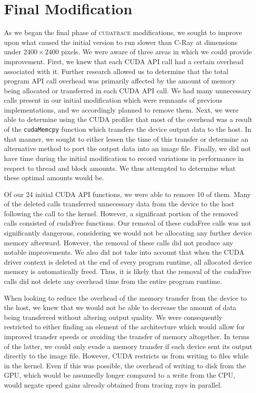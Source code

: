 \documentclass[12pt]{article}
\begin{document}
\section{Final Modification}
As we began the final phase of \textsc{cudatrace} modifications, we sought to improve upon what caused the initial version to run slower than C-Ray at dimensions under $2400 \times 2400$ pixels.  We were aware of three areas in which we could provide improvement. First, we knew that each CUDA API call had a certain overhead associated with it. Further research allowed us to determine that the total program API call overhead was primarily affected by the amount of memory being allocated or transferred in each CUDA API call. We had many unnecessary calls present in our initial modification which were remnants of previous implementations, and we accordingly planned to remove them. Next, we were able to determine using the CUDA profiler that most of the overhead was a result of the \texttt{cudaMemcpy} function which transfers the device output data to the host. In that manner, we sought to either lessen the time of this transfer or determine an alternative method to port the output data into an image file. Finally, we did not have time during the initial modification to record variations in performance in respect to thread and block amounts. We thus attempted to determine what these optimal amounts would be.

Of our 24 initial CUDA API functions, we were able to remove 10 of them. Many of the deleted calls transferred unnecessary data from the device to the host following the call to the kernel. However, a significant portion of the removed calls consisted of cudaFree functions. Our removal of these cudaFree calls was not significantly dangerous, considering we would not be allocating any further device memory afterward. However, the removal of these calls did not produce any notable  improvements. We also did not take into account that when the CUDA driver context is deleted at the end of every program runtime, all allocated device memory is automatically freed. Thus, it is likely that the removal of the cudaFree calls did not delete any overhead time from the entire program runtime. 

When looking to reduce the overhead of the memory transfer from the device to the host, we knew that we would not be able to decrease the amount of data being transferred without altering output quality. We were consequently restricted to either finding an element of the architecture which would allow for improved transfer speeds or avoiding the transfer of memory altogether. In terms of the latter, we could only evade a memory transfer if each device sent its output directly to the image file. However, CUDA restricts us from writing to files while in the kernel. Even if this was possible, the overhead of writing to disk from the GPU, which would be assumedly longer compared to a write from the CPU, would negate speed gains already obtained from tracing rays in parallel. 
\end{document}
